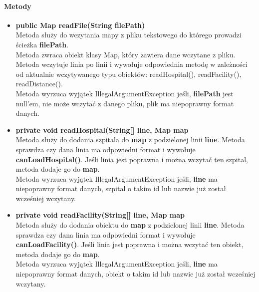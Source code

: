 \documentclass[]{article}
\begin{document}
                \paragraph{Metody}
                    \begin{itemize}
                        \item \textbf{public Map readFile(String filePath)}\\
                            Metoda służy do wczytania mapy z pliku tekstowego do którego prowadzi ścieżka \textbf{filePath}.\\
                            Metoda zwraca obiekt klasy Map, który zawiera dane wczytane z pliku.\\
                            Metoda wczytuje linia po linii i wywołuje odpowiednia metodę w zależności od aktualnie wczytywanego typu obiektów: readHospital(), readFacility(), readDistance().\\
                            Metoda wyrzuca wyjątek IllegalArgumentException jeśli,
                                \textbf{filePath} jest null'em,
                                nie może wczytać z danego pliku,
                                plik ma niepoprawny format danych.
                                
                        \item \textbf{private void readHospital(String[] line, Map map}\\
                            Metoda służy do dodania szpitala do \textbf{map} z podzielonej linii \textbf{line}.
                            Metoda sprawdza czy dana linia ma odpowiedni format i wywołuje \textbf{canLoadHospital()}.
                            Jeśli linia jest poprawna i można wczytać ten szpital, metoda dodaje go do \textbf{map}.\\
                            Metoda wyrzuca wyjątek IllegalArgumentException jeśli,
                                \textbf{line} ma niepoprawny format danych,
                                szpital o takim id lub nazwie już został wcześniej wczytany.
                        
                        \item \textbf{private void readFacility(String[] line, Map map}\\
                            Metoda służy do dodania obiektu do \textbf{map} z podzielonej linii \textbf{line}.
                            Metoda sprawdza czy dana linia ma odpowiedni format i wywołuje \textbf{canLoadFacility()}.
                            Jeśli linia jest poprawna i można wczytać ten obiekt, metoda dodaje go do \textbf{map}.\\
                            Metoda wyrzuca wyjątek IllegalArgumentException jeśli,
                                \textbf{line} ma niepoprawny format danych,
                                obiekt o takim id lub nazwie już został wcześniej wczytany.
                                

\end{itemize}
\end{document}

